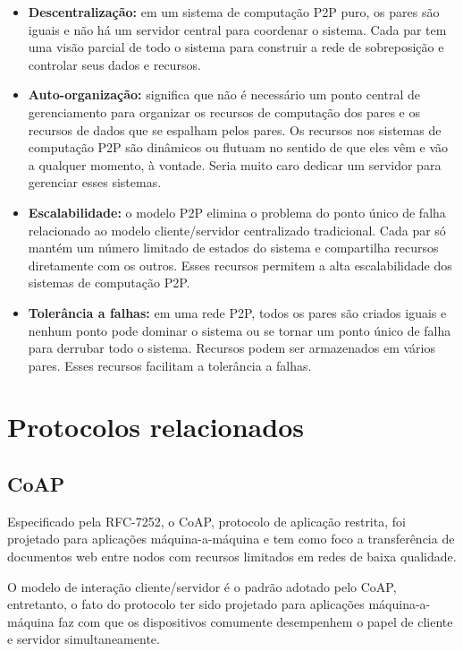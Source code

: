 \begin{itemize}
    \item \textbf{Descentralização:} em um sistema de computação P2P puro, os pares são iguais e não há um servidor central para coordenar o sistema.
    Cada par tem uma visão parcial de todo o sistema para construir a rede de sobreposição e controlar seus dados e recursos.

    \item \textbf{Auto-organização:} significa que não é necessário um ponto central de gerenciamento para organizar os recursos de computação dos pares e os recursos de dados que se espalham pelos pares.
    Os recursos nos sistemas de computação P2P são dinâmicos ou flutuam no sentido de que eles vêm e vão a qualquer momento, à vontade.
    Seria muito caro dedicar um servidor para gerenciar esses sistemas.

    \item \textbf{Escalabilidade:} o modelo P2P elimina o problema do ponto único de falha relacionado ao modelo cliente/servidor centralizado tradicional.
    Cada par só mantém um número limitado de estados do sistema e compartilha recursos diretamente com os outros.
    Esses recursos permitem a alta escalabilidade dos sistemas de computação P2P.

    \item \textbf{Tolerância a falhas:} em uma rede P2P, todos os pares são criados iguais e nenhum ponto pode dominar o sistema ou se tornar um ponto único de falha para derrubar todo o sistema.
    Recursos podem ser armazenados em vários pares.
    Esses recursos facilitam a tolerância a falhas.

\end{itemize}

\section{Protocolos relacionados}

\subsection{CoAP}

Especificado pela RFC-7252, o CoAP, protocolo de aplicação restrita, foi projetado para aplicações máquina-a-máquina
e tem como foco a transferência de documentos web entre nodos com recursos limitados em redes de baixa qualidade\cite{rfc7252}.

O modelo de interação cliente/servidor é o padrão adotado pelo CoAP, entretanto,
o fato do protocolo ter sido projetado para aplicações máquina-a-máquina faz com que os dispositivos comumente desempenhem o papel de cliente e servidor simultaneamente.

